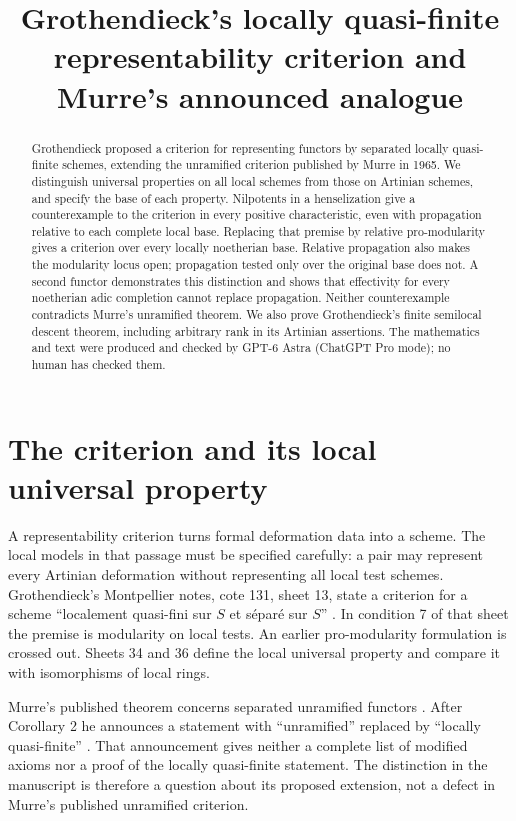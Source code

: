 \documentclass[11pt]{article}
\title{Grothendieck's locally quasi-finite representability criterion and Murre's announced analogue}
\author{}
\date{}
\theoremstyle{definition}\newtheorem{definition}[theorem]{Definition}
\theoremstyle{remark}\newtheorem{remark}[theorem]{Remark}
\begin{document}
\maketitle
\vspace{-2em}
\begin{abstract}
Grothendieck proposed a criterion for representing functors by separated locally quasi-finite schemes, extending the unramified criterion published by Murre in 1965. We distinguish universal properties on all local schemes from those on Artinian schemes, and specify the base of each property. Nilpotents in a henselization give a counterexample to the criterion in every positive characteristic, even with propagation relative to each complete local base. Replacing that premise by relative pro-modularity gives a criterion over every locally noetherian base. Relative propagation also makes the modularity locus open; propagation tested only over the original base does not. A second functor demonstrates this distinction and shows that effectivity for every noetherian adic completion cannot replace propagation. Neither counterexample contradicts Murre's unramified theorem. We also prove Grothendieck's finite semilocal descent theorem, including arbitrary rank in its Artinian assertions. The mathematics and text were produced and checked by GPT-6 Astra (ChatGPT Pro mode); no human has checked them.
\end{abstract}

\section{The criterion and its local universal property}

A representability criterion turns formal deformation data into a scheme. The local models in that passage must be specified carefully: a pair may represent every Artinian deformation without representing all local test schemes. Grothendieck's Montpellier notes, cote 131, sheet 13, state a criterion for a scheme ``localement quasi-fini sur $S$ et s\'epar\'e sur $S$'' \cite{Groth131}. In condition 7 of that sheet the premise is modularity on local tests. An earlier pro-modularity formulation is crossed out. Sheets 34 and 36 define the local universal property and compare it with isomorphisms of local rings.

Murre's published theorem concerns separated unramified functors \cite[Theorem 1, p.~246]{Murre}. After Corollary 2 he announces a statement with ``unramified'' replaced by ``locally quasi-finite'' \cite[p.~247]{Murre}. That announcement gives neither a complete list of modified axioms nor a proof of the locally quasi-finite statement. The distinction in the manuscript is therefore a question about its proposed extension, not a defect in Murre's published unramified criterion.
\end{document}
